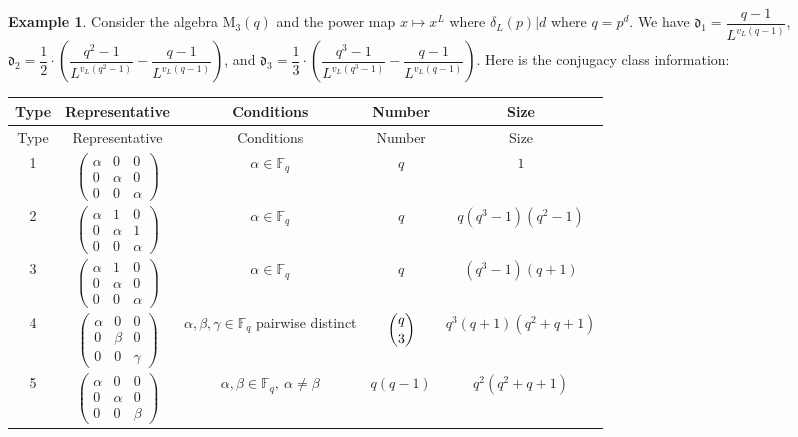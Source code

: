 \documentclass[11pt,twoside]{amsart}
\newcommand{\M}{\mathrm{M}}
\newcommand{\F}{\mathbb{F}}
\renewcommand{\d}{\mathfrak d}
\theoremstyle{definition} %
\newtheorem{example}[lemma]{Example}
\begin{document}
\begin{example}\label{exm:m-3-q}
    Consider the algebra $\M_3(q)$ and the power map $x\mapsto x^L$ where $\delta_L(p)|d$ where $q=p^d$. 
    We have $\d_1=\dfrac{q-1}{L^{v_L(q-1)}}$, $\d_2=\dfrac{1}{2}\cdot\left(\dfrac{q^2-1}{L^{v_L(q^2-1)}}-\dfrac{q-1}{L^{v_L(q-1)}}\right)$, and $\d_3=\dfrac{1}{3}\cdot\left(\dfrac{q^3-1}{L^{v_L(q^3-1)}}-\dfrac{q-1}{L^{v_L(q-1)}}\right)$.
    Here is the conjugacy class information:
\begin{center}
\begin{center}
\renewcommand{\arraystretch}{1.4}
\begin{longtable}{ccccc}
\hline
Type
& Representative
& Conditions
& Number
& Size \\
\hline
\endfirsthead

\hline
Type
& Representative
& Conditions
& Number
& Size \\
\hline
\endhead

1
&
$\begin{pmatrix}
\alpha&0&0\\
0&\alpha&0\\
0&0&\alpha
\end{pmatrix}$
&
$\alpha\in\F_q$
&
$q$
&
$1$
\\

2
&
$\begin{pmatrix}
\alpha&1&0\\
0&\alpha&1\\
0&0&\alpha
\end{pmatrix}$
&
$\alpha\in\F_q$
&
$q$
&
$q(q^3-1)(q^2-1)$
\\

3
&
$\begin{pmatrix}
\alpha&1&0\\
0&\alpha&0\\
0&0&\alpha
\end{pmatrix}$
&
$\alpha\in\F_q$
&
$q$
&
$(q^3-1)(q+1)$
\\

4
&
$\begin{pmatrix}
\alpha&0&0\\
0&\beta&0\\
0&0&\gamma
\end{pmatrix}$
&
$\alpha,\beta,\gamma\in\F_q$ pairwise distinct
&
$\dbinom{q}{3}$
&
$q^3(q+1)(q^2+q+1)$
\\

5
&
$\begin{pmatrix}
\alpha&0&0\\
0&\alpha&0\\
0&0&\beta
\end{pmatrix}$
&
$\alpha,\beta\in\F_q,\ \alpha\neq\beta$
&
$q(q-1)$
&
$q^2(q^2+q+1)$
\\


\end{longtable}
\end{center}
\end{center}
\end{example}
\end{document}
